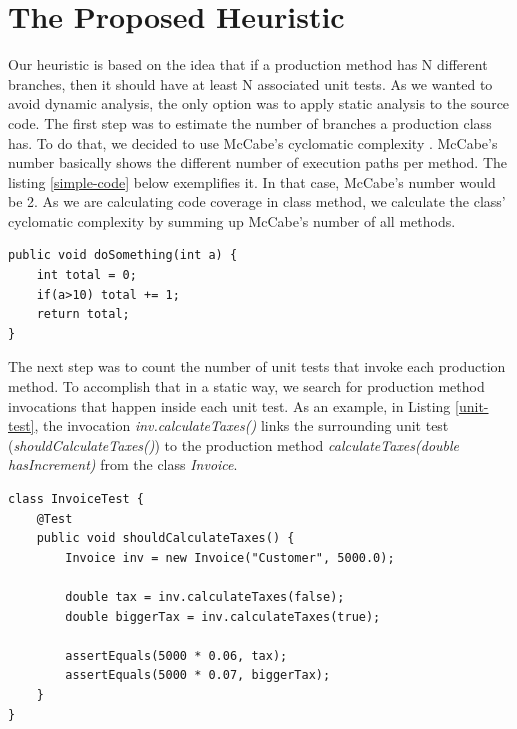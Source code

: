 \documentclass{sig-alternate}
\begin{document}
\section{The Proposed Heuristic}
\label{sec-heuristic}

Our heuristic is based on the idea that if a production method has N different branches, then it should
have at least N associated unit tests. As we wanted to avoid dynamic analysis, the only option was 
to apply static analysis to the source code. The first step was to estimate the number of branches 
a production class has. To do that, we decided to use McCabe's cyclomatic complexity \cite{mccabe}.
McCabe's number basically shows the different number of execution paths per method. The listing
\ref{simple-code} below exemplifies it. In that case, McCabe's number would be 2.
As we are calculating code coverage in class method, we calculate the class' cyclomatic complexity
by summing up McCabe's number of all methods.

\begin{lstlisting}
public void doSomething(int a) {
	int total = 0;
	if(a>10) total += 1;
	return total;
}
\end{lstlisting}

The next step was to count the number of unit tests that invoke each production method. To accomplish that
in a static way, we search for production method invocations that happen inside each unit test. As an example, in Listing
\ref{unit-test}, the invocation \textit{inv.calculateTaxes()} links the surrounding unit test (\textit{shouldCalculateTaxes()}) to 
the production method \textit{calculateTaxes(double hasIncrement)} from the class \textit{Invoice}.

\begin{lstlisting}
class InvoiceTest {
	@Test
	public void shouldCalculateTaxes() {
		Invoice inv = new Invoice("Customer", 5000.0);

		double tax = inv.calculateTaxes(false);
		double biggerTax = inv.calculateTaxes(true);
		
		assertEquals(5000 * 0.06, tax);
		assertEquals(5000 * 0.07, biggerTax);
	}
}
\end{lstlisting}

\end{document}
